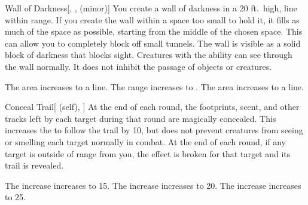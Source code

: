 \lowercase{\hypertarget{spell:Wall of Darkness}{}}\label{spell:Wall of Darkness}
\begin{freeability}[Rank 1]{\hypertarget{spell:Wall of Darkness}{Wall of Darkness}}[, ,  (minor)]
\targetrule
You create a wall of darkness in a 20 ft.\ high, \areamed line within \rngmed range.
If you create the wall within a space too small to hold it, it fills as much of the space as possible, starting from the middle of the chosen space.
This can allow you to completely block off small tunnels.
The wall is visible as a solid block of darkness that blocks sight.
Creatures with the  ability can see through the wall normally.
It does not inhibit the passage of objects or creatures.

\rankline
{} The area increases to a \arealarge line.
 The range increases to \rnglong.
 The area increases to a \areahuge line.
\end{freeability}
\vspace{0.25em}



\lowercase{\hypertarget{spell:Conceal Trail}{}}\label{spell:Conceal Trail}
\begin{attuneability}[Rank 2]{\hypertarget{spell:Conceal Trail}{Conceal Trail}}[ (self), ]
At the end of each round, the footprints, scent, and other tracks left by each target during that round are magically concealed.
This increases the  to follow the trail by 10, but does not prevent creatures from seeing or smelling each target normally in combat.
At the end of each round, if any target is outside of \rnglong range from you, the effect is broken for that target and its trail is revealed.

\rankline
{} The  increase increases to 15.
 The  increase increases to 20.
 The  increase increases to 25.
\end{attuneability}
\vspace{0.25em}



